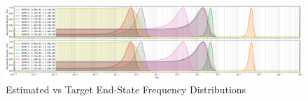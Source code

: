 \begin{landscape}
\begin{figure}[ht!]
\centering
\includegraphics[width=\textwidth]{parts/4_learning/1_param/figs/end_states_predicted.png}
    \caption{Estimated vs Target End-State Frequency Distributions}
    \label{fig:end-states_estimated}
\end{figure}

\end{landscape}
\clearpage